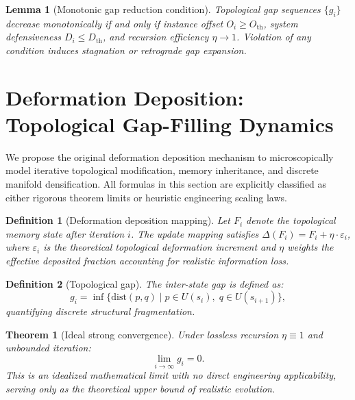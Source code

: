 \documentclass[conference]{IEEEtran}
\newtheorem{definition}{Definition}[section]
\newtheorem{lemma}{Lemma}[section]
\newtheorem{theorem}{Theorem}[section]
\theoremstyle{remark}
\begin{document}
\begin{lemma}[Monotonic gap reduction condition]
\label{lem:gap-reduction}
Topological gap sequences $\{g_i\}$ decrease monotonically if and only if instance offset $O_i\ge O_{\text{th}}$, system defensiveness $D_i\le D_{\text{th}}$, and recursion efficiency $\eta\to1$. Violation of any condition induces stagnation or retrograde gap expansion.
\end{lemma}

\section{Deformation Deposition: Topological Gap-Filling Dynamics}

We propose the original deformation deposition mechanism to microscopically model iterative topological modification, memory inheritance, and discrete manifold densification. All formulas in this section are explicitly classified as either rigorous theorem limits or heuristic engineering scaling laws.

\begin{definition}[Deformation deposition mapping]
\label{def:deformation}
Let $F_i$ denote the topological memory state after iteration $i$. The update mapping satisfies $\Delta(F_i)=F_i+\eta\cdot\varepsilon_i$, where $\varepsilon_i$ is the theoretical topological deformation increment and $\eta$ weights the effective deposited fraction accounting for realistic information loss.
\end{definition}

\begin{definition}[Topological gap]
\label{def:gap}
The inter-state gap is defined as:
\begin{equation}
g_i=\inf\{\text{dist}(p,q)\mid p\in U(s_i),\;q\in U(s_{i+1})\},
\end{equation}
quantifying discrete structural fragmentation.
\end{definition}

\begin{theorem}[Ideal strong convergence]
\label{thm:strong-conv}
Under lossless recursion $\eta\equiv1$ and unbounded iteration:
\begin{equation}
\lim_{i\to\infty}g_i=0.
\end{equation}
\textit{This is an idealized mathematical limit with no direct engineering applicability, serving only as the theoretical upper bound of realistic evolution.}
\end{theorem}
\end{document}
